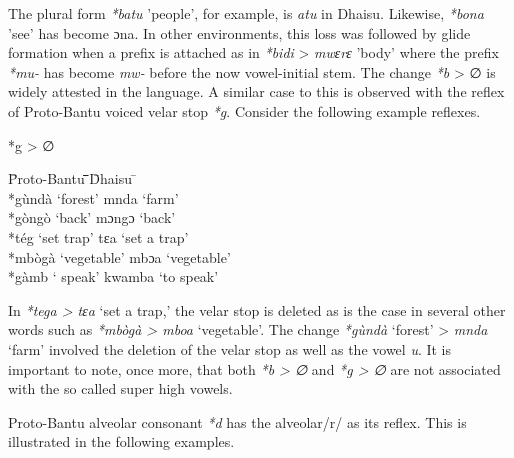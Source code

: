 \documentclass[output=paper,colorlinks,citecolor=brown]{langscibook}
\begin{document}
The plural form \textit{*batu}  'people', for example, is \textit{atu} in Dhaisu. Likewise, \textit{*bona} 'see' has become ɔna. In other environments, this loss was followed by glide formation when a prefix is attached as in \textit{*bidi} > \textit{mwɛrɛ} 'body' where the prefix  \textit{*mu-} has become \textit{mw-} before the now vowel-initial stem. The change \textit{*b} > ∅ is widely attested in the language. A similar case to this is observed with the reflex of Proto-Bantu voiced velar stop \textit{*g}. Consider the following example reflexes. 

\ea%
    \label{ex:ngonyani:7}
    *g > ∅\\
	\begin{tabbing} 
        \= Proto-Bantu \quad\= \quad\= \quad\= \quad\= \quad\= \quad\= \quad\= Dhaisu \quad\=  \quad\= \\
        \> *gùndà
        \> ‘forest’\> \> \>  \> \> \> 
        mnda
        \> ‘farm’\\
        \> *gòngò
        \> ‘back’ \> \> \>  \> \> \> 
        mɔngɔ
        \> ‘back’\\
        \> *tég
        \> ‘set trap’\> \> \>  \> \> \> 
        tɛa
        \> ‘set a trap’\\
        \> *mbògà
        \> ‘vegetable’\> \> \>  \> \> \> 
        mbɔa
        \> ‘vegetable’\\
        \> *gàmb
        ‘\> speak’\> \> \>  \> \> \> 
        kwamba
        \> ‘to speak’
   \end{tabbing}
\z

In \textit{*tega > tɛa} ‘set a trap,’ the velar stop is deleted as is the case in several other words such as \textit{*mbògà > mboa} ‘vegetable’. The change \textit{*gùndà} ‘forest’ > \textit{mnda} ‘farm’ involved the deletion of the velar stop as well as the vowel \textit{u}. It is important to note, once more, that both \textit{*b > ∅} and \textit{*g > ∅} are not associated with the so called super high vowels. 

Proto-Bantu alveolar consonant \textit{*d} has the alveolar/r/ as its reflex. This is illustrated in the following examples. 
\end{document}
